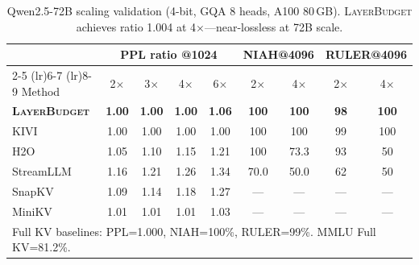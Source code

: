\documentclass{article}
\newcommand{\layerbudget}{\textsc{LayerBudget}\xspace}
\begin{document}
\begin{table}[h]
\centering
\caption{Qwen2.5-72B scaling validation (4-bit, GQA 8 heads, A100 80\,GB).
\layerbudget achieves ratio 1.004 at 4$\times$---near-lossless at 72B scale.}
\label{tab:72b}
\small
\setlength{\tabcolsep}{3pt}
\begin{tabular}{@{}lcccccccc@{}}
\toprule
& \multicolumn{4}{c}{PPL ratio @1024} & \multicolumn{2}{c}{NIAH@4096} & \multicolumn{2}{c}{RULER@4096} \\
\cmidrule(lr){2-5} \cmidrule(lr){6-7} \cmidrule(lr){8-9}
Method & 2$\times$ & 3$\times$ & 4$\times$ & 6$\times$ & 2$\times$ & 4$\times$ & 2$\times$ & 4$\times$ \\
\midrule
\textbf{\layerbudget} & \textbf{1.00} & \textbf{1.00} & \textbf{1.00} & \textbf{1.06} & \textbf{100} & \textbf{100} & \textbf{98} & \textbf{100} \\
KIVI        & 1.00 & 1.00 & 1.00 & 1.00 & 100 & 100 & 99 & 100 \\
H2O         & 1.05 & 1.10 & 1.15 & 1.21 & 100 & 73.3 & 93 & 50 \\
StreamLLM   & 1.16 & 1.21 & 1.26 & 1.34 & 70.0 & 50.0 & 62 & 50 \\
SnapKV      & 1.09 & 1.14 & 1.18 & 1.27 & --- & --- & --- & --- \\
MiniKV      & 1.01 & 1.01 & 1.01 & 1.03 & --- & --- & --- & --- \\
\bottomrule
\multicolumn{9}{l}{\scriptsize Full KV baselines: PPL=1.000, NIAH=100\%, RULER=99\%. MMLU Full KV=81.2\%.}
\end{tabular}
\end{table}


\end{document}
